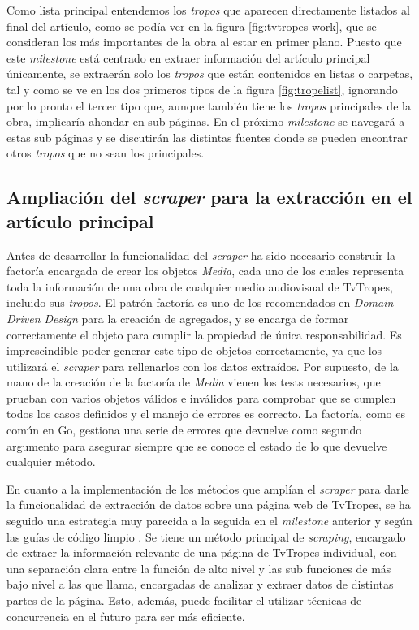 Como lista principal entendemos los \textit{tropos} que aparecen directamente
listados al final del artículo, como se podía ver en la figura
\ref{fig:tvtropes-work}, que se consideran los más importantes de la obra al
estar en primer plano. Puesto que este \textit{milestone} está centrado en
extraer información del artículo principal únicamente, se extraerán solo los
\textit{tropos} que están contenidos en listas o carpetas, tal y como se ve en
los dos primeros tipos de la figura \ref{fig:tropelist}, ignorando por lo pronto
el tercer tipo que, aunque también tiene los \textit{tropos} principales de la
obra, implicaría ahondar en sub páginas. En el próximo \textit{milestone} se
navegará a estas sub páginas y se discutirán las distintas fuentes donde se
pueden encontrar otros \textit{tropos} que no sean los principales.

\subsection{Ampliación del \textit{scraper} para la extracción en el artículo
principal} 

Antes de desarrollar la funcionalidad del \textit{scraper} ha sido necesario
construir la factoría encargada de crear los objetos \textit{Media}, cada uno de
los cuales representa toda la información de una obra de cualquier medio
audiovisual de TvTropes, incluido sus \textit{tropos}. El patrón factoría es uno
de los recomendados en \textit{Domain Driven Design} para la creación de
agregados, y se encarga de formar correctamente el objeto para cumplir la
propiedad de única responsabilidad. Es imprescindible poder generar este tipo de
objetos correctamente, ya que los utilizará el \textit{scraper} para rellenarlos
con los datos extraídos. Por supuesto, de la mano de la creación de la factoría
de \textit{Media} vienen los tests necesarios, que prueban con varios objetos
válidos e inválidos para comprobar que se cumplen todos los casos definidos y el
manejo de errores es correcto. La factoría, como es común en Go, gestiona una
serie de errores que devuelve como segundo argumento para asegurar siempre que
se conoce el estado de lo que devuelve cualquier método.

En cuanto a la implementación de los métodos que amplían el \textit{scraper}
para darle la funcionalidad de extracción de datos sobre una página web de
TvTropes, se ha seguido una estrategia muy parecida a la seguida en el
\textit{milestone} anterior y según las guías de código limpio
\cite{clean_code_rules}. Se tiene un método principal de \textit{scraping},
encargado de extraer la información relevante de una página de TvTropes
individual, con una separación clara entre la función de alto nivel y las sub
funciones de más bajo nivel a las que llama, encargadas de analizar y extraer
datos de distintas partes de la página. Esto, además, puede facilitar el
utilizar técnicas de concurrencia en el futuro para ser más eficiente.

